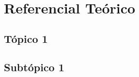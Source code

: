 \section{Referencial Teórico}
\lipsum[1-1]

\subsection{Tópico 1}
\lipsum[1-2]

\subsection{Subtópico 1}
\lipsum[1-2]
